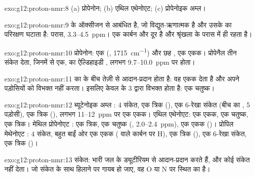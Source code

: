 \begin{solution}{exo:g12:proton-nmr:8}
(a) प्रोपेनोन; (b) एथिल एथेनोएट; (c) प्रोपेनोइक अम्ल।
\end{solution}

\begin{solution}{exo:g12:proton-nmr:9}
  के ऑक्सीजन  से आबंधित है, जो
विद्युत-ऋणात्मक है और उसके  का परिरक्षण घटाता है:  परास,
3.3--\qty{4.5}{ppm}।  एक कार्बन और दूर है और
श्रृंखला के परास में ही रहता है।
\end{solution}

\begin{solution}{exo:g12:proton-nmr:10}
प्रोपेनोन: एक  (, \qty{1715}{cm^{-1}}) और छह , एक एकक। प्रोपेनैल तीन संकेत देता, जिनमें से एक,
 का ऐल्डिहाइडी , लगभग 9.7--\qty{10.0}{ppm} पर होता।
\end{solution}

\begin{solution}{exo:g12:proton-nmr:11}
  का  के बीच तेज़ी से आदान-प्रदान होता है: वह
एकक देता है और अपने पड़ोसियों को विभक्त नहीं करता। इसलिए 
केवल  के 3  द्वारा विभक्त होता है: एक चतुष्क।
\end{solution}

\begin{solution}{exo:g12:proton-nmr:12}
ब्यूटेनोइक अम्ल : 4 संकेत, एक त्रिक (), एक
6-रेखा संकेत (बीच का , 5 पड़ोसी), एक त्रिक
(), लगभग 11--\qty{12}{ppm} पर एक एकक। एथिल एथेनोएट: एक
एकक, एक चतुष्क, एक त्रिक। मेथिल प्रोपेनोएट :
एक त्रिक, एक चतुष्क (, 2.0--\qty{2.4}{ppm}), एक एकक
()। प्रोपिल मेथेनोएट : 4 संकेत,
बहुत बाईं ओर एक एकक ( वाले कार्बन पर H), एक त्रिक
(), एक 6-रेखा संकेत, एक त्रिक ()।
\end{solution}

\begin{solution}{exo:g12:proton-nmr:13}
 संकेत:   भारी जल के ड्यूटीरियम से
आदान-प्रदान करते हैं, और  कोई  संकेत नहीं देता। जो संकेत
 के साथ हिलाने पर गायब हो जाए, वह O या N पर स्थित  का है।
\end{solution}


